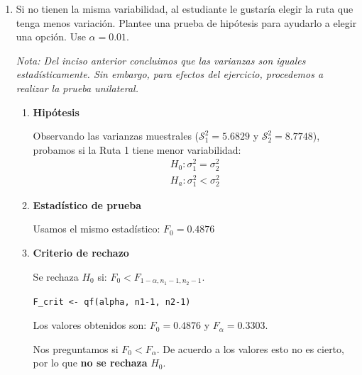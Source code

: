 \documentclass[12pt,a4paper]{article}
\begin{document}
\begin{enumerate}
\begin{enumerate}
\begin{enumerate}
      Los valores obtenidos son: $F_0 = 0.4876$, $F_{\alpha/2} = 0.2914$ y $F_{1-\alpha/2} = 3.4318$.
      
      Nos preguntamos si $F_0 < F_{\alpha/2}$ o $F_0 > F_{1-\alpha/2}$. De acuerdo a los valores esto no es cierto, por lo que \textbf{no se rechaza} $H_0$. 
      
      \textbf{Conclusión:} No hay evidencia estadística que indique que las varianzas son diferentes. Con un nivel de significancia de 0.01, podemos considerar que ambas rutas tienen la misma variabilidad.
    \end{enumerate}

    \item Si no tienen la misma variabilidad, al estudiante le gustaría elegir la ruta que tenga menos variación. Plantee una prueba de hipótesis para ayudarlo a elegir una opción. Use $\alpha=0.01$.
    
    \textit{Nota: Del inciso anterior concluimos que las varianzas son iguales estadísticamente. Sin embargo, para efectos del ejercicio, procedemos a realizar la prueba unilateral.}
    
    \begin{enumerate}
      \item \textbf{Hipótesis}
      
      Observando las varianzas muestrales ($\mathcal{S}_1^2 = 5.6829$ y $\mathcal{S}_2^2 = 8.7748$), probamos si la Ruta 1 tiene menor variabilidad:
      \[
        \begin{array}{c}
          H_0 : \sigma_1^2 = \sigma_2^2 \\
          H_a : \sigma_1^2 < \sigma_2^2
        \end{array}
      \]

      \item \textbf{Estadístico de prueba}
      
      Usamos el mismo estadístico: $F_0 = 0.4876$
      
      \item \textbf{Criterio de rechazo}
      
      Se rechaza $H_0$ si: $F_0 < F_{1-\alpha, n_1-1, n_2-1}$. 
      
      \begin{lstlisting}
F_crit <- qf(alpha, n1-1, n2-1)
      \end{lstlisting}

      Los valores obtenidos son: $F_0 = 0.4876$ y $F_{\alpha} = 0.3303$.
      
      Nos preguntamos si $F_0 < F_{\alpha}$. De acuerdo a los valores esto no es cierto, por lo que \textbf{no se rechaza} $H_0$. 
      

\end{enumerate}
\end{enumerate}
\end{enumerate}
\end{document}
